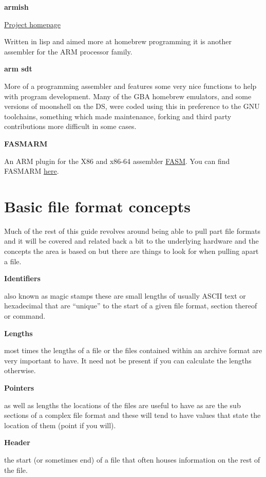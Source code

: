 \documentclass[
]{book}
\begin{document}
\textbf{armish}

\href{http://common-lisp.net/project/armish/}{Project homepage}

Written in lisp and aimed more at homebrew programming it is another assembler for the ARM processor family.

\textbf{arm sdt}

More of a programming assembler and features some very nice functions to help with program development. Many of the GBA homebrew emulators, and some versions of moonshell on the DS, were coded using this in preference to the GNU toolchains, something which made maintenance, forking and third party contributions more difficult in some cases.

\textbf{FASMARM}

An ARM plugin for the X86 and x86-64 assembler \href{http://flatassembler.net/}{FASM}. You can find FASMARM \href{http://arm.flatassembler.net/}{here}.

\hypertarget{basic-file-format-concepts}{%
\section{Basic file format concepts}\label{basic-file-format-concepts}}

Much of the rest of this guide revolves around being able to pull part file formats and it will be covered and related back a bit to the underlying hardware and the concepts the area is based on but there are things to look for when pulling apart a file.

\textbf{Identifiers}

also known as magic stamps these are small lengths of usually ASCII text or hexadecimal that are ``unique'' to the start of a given file format, section thereof or command.

\textbf{Lengths}

most times the lengths of a file or the files contained within an archive format are very important to have. It need not be present if you can calculate the lengths otherwise.

\textbf{Pointers}

as well as lengths the locations of the files are useful to have as are the sub sections of a complex file format and these will tend to have values that state the location of them (point if you will).

\textbf{Header}

the start (or sometimes end) of a file that often houses information on the rest of the file.
\end{document}
